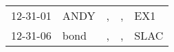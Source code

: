 \begin{supertabular}{p{0.07\textwidth}p{0.06\textwidth}p{0.02\textwidth}p{0.02\textwidth}p{0.06\textwidth}}
 12-31-01\textsuperscript{} &  ANDY\textsuperscript{} &  , &  , &   EX1\textsuperscript{} \\
 12-31-06\textsuperscript{} &  bond\textsuperscript{} &  , &  , &  SLAC\textsuperscript{} \\
\end{supertabular}
